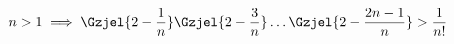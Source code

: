 $$
	n>1 \implies \Gzjel{ 2 - \frac{1}{n} } \Gzjel{ 2 - \frac{3}{n} } \hdots \Gzjel{ 2 - \frac{2n-1}{n} } >
	\frac{1}{n!}
$$
